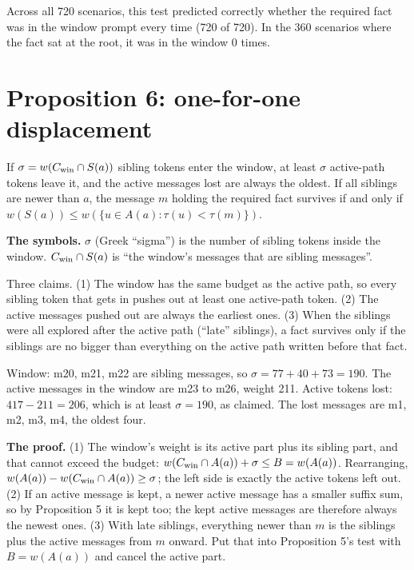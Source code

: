 \begin{example}
Across all 720 scenarios, this test predicted correctly whether the required fact was in the window prompt every time (720 of 720). In the 360 scenarios where the fact sat at the root, it was in the window 0 times.
\end{example}

\section{Proposition 6: one-for-one displacement}

\begin{paper}
If $\sigma=w(C_{\mathrm{win}}\cap S(a))$ sibling tokens enter the window, at least $\sigma$ active-path tokens leave it, and the active messages lost are always the oldest. If all siblings are newer than $a$, the message $m$ holding the required fact survives if and only if $w(S(a))\le w(\{u\in A(a):\tau(u)<\tau(m)\})$.
\end{paper}

\textbf{The symbols.} $\sigma$ (Greek ``sigma'') is the number of sibling tokens inside the window. $C_{\mathrm{win}} \cap S(a)$ is ``the window's messages that are sibling messages''.

\begin{plain}
Three claims. (1) The window has the same budget as the active path, so every sibling token that gets in pushes out at least one active-path token. (2) The active messages pushed out are always the earliest ones. (3) When the siblings were all explored after the active path (``late'' siblings), a fact survives only if the siblings are no bigger than everything on the active path written before that fact.
\end{plain}

\begin{example}
Window: m20, m21, m22 are sibling messages, so $\sigma = 77 + 40 + 73 = 190$. The active messages in the window are m23 to m26, weight 211. Active tokens lost: $417 - 211 = 206$, which is at least $\sigma = 190$, as claimed. The lost messages are m1, m2, m3, m4, the oldest four.
\end{example}

\textbf{The proof.} (1) The window's weight is its active part plus its sibling part, and that cannot exceed the budget: $w(C_{\mathrm{win}} \cap A(a)) + \sigma \le B = w(A(a))$. Rearranging, $w(A(a)) - w(C_{\mathrm{win}} \cap A(a)) \ge \sigma$; the left side is exactly the active tokens left out. (2) If an active message is kept, a newer active message has a smaller suffix sum, so by Proposition 5 it is kept too; the kept active messages are therefore always the newest ones. (3) With late siblings, everything newer than $m$ is the siblings plus the active messages from $m$ onward. Put that into Proposition 5's test with $B = w(A(a))$ and cancel the active part.

